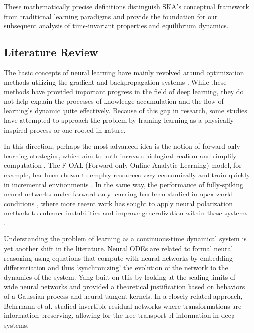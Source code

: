 \documentclass{article}
\begin{document}
	These mathematically precise definitions distinguish SKA's conceptual framework from traditional learning paradigms and provide the foundation for our subsequent analysis of time-invariant properties and equilibrium dynamics.
	

\subsection{Literature Review}

The basic concepts of neural learning have mainly revolved around optimization methods utilizing the gradient and backpropagation systems \cite{rumelhart1986learning}. While these methods have provided important progress in the field of deep learning, they do not help explain the processes of knowledge accumulation and the flow of learning's dynamic quite effectively. Because of this gap in research, some studies have attempted to approach the
problem by framing learning as a physically-inspired process or one rooted in nature.  

In this direction, perhaps the most advanced idea is the notion of forward-only learning strategies, which aim to both increase biological realism and simplify computation \cite{lillicrap2016random, terres2024ecai}. The F-OAL (Forward-only Online Analytic Learning) model, for example, has been shown to employ resources very economically and train quickly in incremental environments \cite{zhuang2024f}. In the same way, the performance of fully-spiking neural networks under forward-only learning has been studied in open-world conditions \cite{terres2024}, where more recent work has sought to apply neural polarization methods to enhance instabilities and improve generalization within these systems \cite{terres2024ecai}.

Understanding the problem of learning as a continuous-time dynamical system is yet another shift in the literature. Neural ODEs \cite{chen2018neural} are related to formal neural reasoning using equations that compute with neural networks by embedding differentiation and thus ‘synchronizing’ the evolution of the network to the dynamics of the system. Yang \cite{yang2019physical} built on this by looking at the scaling limits of wide neural networks and provided a theoretical justification based on behaviors of a Gaussian process and neural tangent kernels. In a closely related approach, Behrmann et al. \cite{behrmann2019invertible} studied invertible residual networks where transformations are information preserving, allowing for the free transport of information in deep systems.
\end{document}
